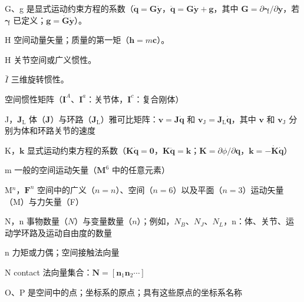 \documentclass[10pt,a4paper]{book}
\theoremstyle{thmstyle} %
\theoremstyle{defstyle} %
\theoremstyle{prostyle} %
\begin{document}
G、g 是显式运动约束方程的系数（$\dot{\boldsymbol{q}}=\boldsymbol{G}\dot{\boldsymbol{y}}$，$\ddot{\boldsymbol{q}}=\boldsymbol{G}\dot{\boldsymbol{y}}+\boldsymbol{g}$，其中 $\boldsymbol{G}=\partial\boldsymbol{\gamma}/\partial\boldsymbol{y}$，若 $\boldsymbol{\gamma}$ 已定义；$\boldsymbol{g}=\dot{\boldsymbol{G}}\dot{\boldsymbol{y}}$）。



H 空间动量矢量；质量的第一矩（$\boldsymbol{h}=m\boldsymbol{c}$）。



H 关节空间或广义惯性。



$\bar{I}$ 三维旋转惯性。



空间惯性矩阵（$\boldsymbol{I}^{A}$、$\boldsymbol{I}^{a}$：关节体，$\boldsymbol{I}^{c}$：复合刚体）



J，$\boldsymbol{J}_{\mathrm{L}}$ 体（$\boldsymbol{J}$）与环路（$\boldsymbol{J}_{\mathrm{L}}$）雅可比矩阵：$\boldsymbol{v}=\boldsymbol{J}\dot{\boldsymbol{q}}$ 和 $\boldsymbol{v}_{\mathrm{J}}=\boldsymbol{J}_{\mathrm{L}}\dot{\boldsymbol{q}}$，其中 $\boldsymbol{v}$ 和 $\boldsymbol{v}_{\mathrm{J}}$ 分别为体和环路关节的速度



K，$\boldsymbol{k}$ 显式运动约束方程的系数（$\boldsymbol{K}\dot{\boldsymbol{q}}=\boldsymbol{0}$，$\boldsymbol{K}\ddot{\boldsymbol{q}}=\boldsymbol{k}$；$\boldsymbol{K}=\partial\phi/\partial\boldsymbol{q}$，$\boldsymbol{k}=-\dot{\boldsymbol{K}}\dot{\boldsymbol{q}}$）



m 一般的空间运动矢量（$\mathbf{M}^{6}$ 中的任意元素）



M$^{n}$，$\mathbf{F}^{n}$ 空间中的广义（$n=n$）、空间（$n=6$）以及平面（$n=3$）运动矢量（M）与力矢量（F）



N，n 事物数量（$N$）与变量数量（$n$）；例如，$N_{B}$、$N_{J}$、$N_{L}$，n：体、关节、运动学环路及运动自由度的数量



n 力矩或力偶；空间接触法向量



N  contact 法向量集合：$\boldsymbol{N}=[\boldsymbol{n}_{1}\boldsymbol{n}_{2}\cdots]$



O、P 是空间中的点；坐标系的原点；具有这些原点的坐标系名称
\end{document}
